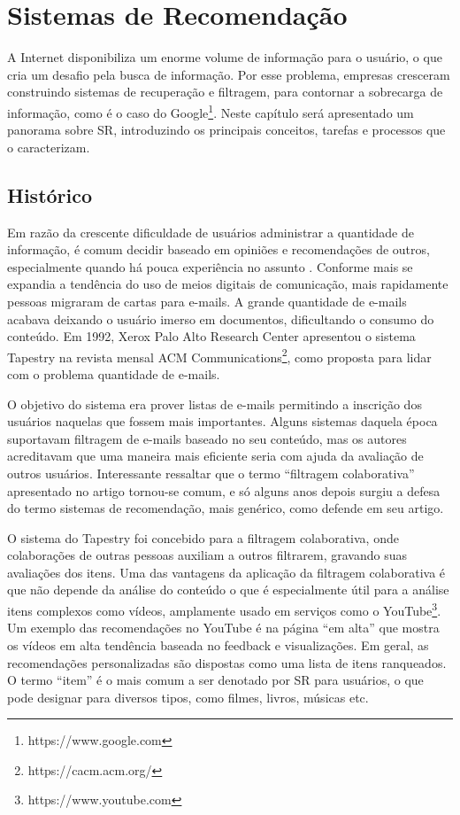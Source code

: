 \chapter{Sistemas de Recomendação}
\label{cap:recsys}

A Internet disponibiliza um enorme volume de informação para o usuário, o que cria um desafio pela busca de informação. Por esse problema, empresas cresceram construindo sistemas de recuperação e filtragem, para contornar a sobrecarga de informação, como é o caso do Google\footnote{https://www.google.com}. Neste capítulo será apresentado um panorama sobre SR, introduzindo os principais conceitos, tarefas e processos que o caracterizam.

\section{Histórico}
Em razão da crescente dificuldade de usuários administrar a quantidade de informação, é comum decidir baseado em opiniões e recomendações de outros, especialmente quando há pouca experiência no assunto \citep{Resnick:1997:RS:245108.245121}. Conforme mais se expandia a tendência do uso de meios digitais de comunicação, mais rapidamente pessoas migraram de cartas para e-mails. A grande quantidade de e-mails acabava deixando o usuário imerso em documentos, dificultando o consumo do conteúdo. Em 1992, Xerox Palo Alto Research Center apresentou o sistema Tapestry \citep{Goldberg:1992:UCF:138859.138867} na revista mensal ACM Communications\footnote{https://cacm.acm.org/}, como proposta para lidar com o problema quantidade de e-mails. 

O objetivo do sistema era prover listas de e-mails permitindo a inscrição dos usuários naquelas que fossem mais importantes. Alguns sistemas daquela época suportavam filtragem de e-mails baseado no seu conteúdo, mas os autores acreditavam que uma maneira mais eficiente seria com ajuda da avaliação de outros usuários. Interessante ressaltar que o termo “filtragem colaborativa” apresentado no artigo tornou-se comum, e só alguns anos depois surgiu a defesa do termo sistemas de recomendação, mais genérico, como defende \cite{Resnick:1997:RS:245108.245121} em seu artigo.

O sistema do Tapestry foi concebido para a filtragem colaborativa, onde colaborações de outras pessoas auxiliam a outros filtrarem, gravando suas avaliações dos itens. Uma das vantagens da aplicação da filtragem colaborativa é que não depende da análise do conteúdo o que é especialmente útil para a análise itens complexos como vídeos, amplamente usado em serviços como o YouTube\footnote{https://www.youtube.com}. Um exemplo das recomendações no YouTube é na página “em alta” que mostra os vídeos em alta tendência baseada no feedback e visualizações. Em geral, as recomendações personalizadas são dispostas como uma lista de itens ranqueados. O termo “item” é o mais comum a ser denotado por SR para usuários, o que pode designar para diversos tipos, como filmes, livros, músicas etc. 

